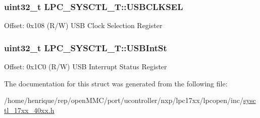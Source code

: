 \hypertarget{structLPC__SYSCTL__T_a6d004c6e6657a7fe78e75bd3e3ea00c4}{
\subsubsection[{U\-S\-B\-C\-L\-K\-S\-E\-L}]{ uint32\-\_\-t L\-P\-C\-\_\-\-S\-Y\-S\-C\-T\-L\-\_\-\-T\-::\-U\-S\-B\-C\-L\-K\-S\-E\-L}}\label{structLPC__SYSCTL__T_a6d004c6e6657a7fe78e75bd3e3ea00c4}
Offset\-: 0x108 (R/\-W) U\-S\-B Clock Selection Register \hypertarget{structLPC__SYSCTL__T_a0505fe464c77b1421ebbd8f9d1cd9f2a}{
\subsubsection[{U\-S\-B\-Int\-St}]{ uint32\-\_\-t L\-P\-C\-\_\-\-S\-Y\-S\-C\-T\-L\-\_\-\-T\-::\-U\-S\-B\-Int\-St}}\label{structLPC__SYSCTL__T_a0505fe464c77b1421ebbd8f9d1cd9f2a}
Offset\-: 0x1\-C0 (R/\-W) U\-S\-B Interrupt Status Register 

The documentation for this struct was generated from the following file\-:\begin{DoxyCompactItemize}
\item 
/home/henrique/rep/open\-M\-M\-C/port/ucontroller/nxp/lpc17xx/lpcopen/inc/\hyperlink{sysctl__17xx__40xx_8h}{sysctl\-\_\-17xx\-\_\-40xx.\-h}\end{DoxyCompactItemize}
